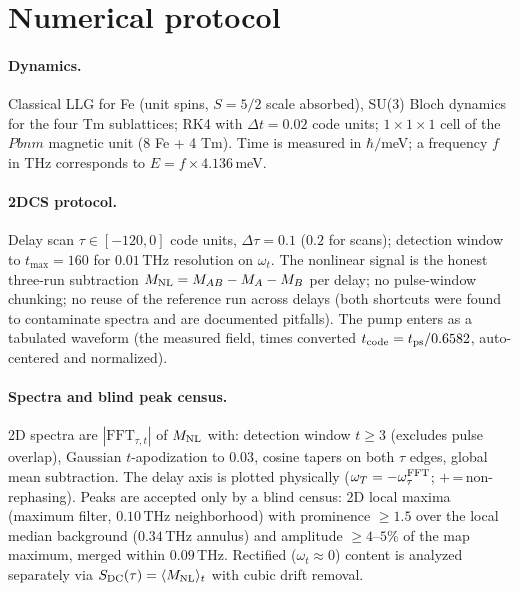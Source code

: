 \documentclass[11pt]{article}
\newcommand{\Mnl}{M_{\rm NL}}
\begin{document}
\section{Numerical protocol}
\label{si:numerics}

\paragraph{Dynamics.}  Classical LLG for Fe (unit spins, $S=5/2$ scale
absorbed), SU(3) Bloch dynamics for the four Tm sublattices; RK4 with
$\Delta t=0.02$ code units; $1\times1\times1$ cell of the $Pbnm$
magnetic unit (8 Fe + 4 Tm).  Time is measured in $\hbar/$meV; a
frequency $f$ in THz corresponds to $E=f\times4.136$\,meV.

\paragraph{2DCS protocol.}  Delay scan $\tau\in[-120,0]$ code units,
$\Delta\tau=0.1$ ($0.2$ for scans); detection window to
$t_{\max}=160$ for $0.01$\,THz resolution on $\omega_t$.  The nonlinear
signal is the honest three-run subtraction
$\Mnl=M_{AB}-M_A-M_B$ per delay; no pulse-window chunking; no reuse of
the reference run across delays (both shortcuts were found to
contaminate spectra and are documented pitfalls).  The pump enters as a
tabulated waveform (the measured field, times converted
$t_{\rm code}=t_{\rm ps}/0.6582$, auto-centered and normalized).

\paragraph{Spectra and blind peak census.}  2D spectra are
$|\mathrm{FFT}_{\tau,t}|$ of $\Mnl$ with: detection window $t\geq3$
(excludes pulse overlap), Gaussian $t$-apodization to $0.03$, cosine
tapers on both $\tau$ edges, global mean subtraction.  The delay axis is
plotted physically ($\omega_T=-\omega_\tau^{\rm FFT}$;
$+$\,=\,non-rephasing).  Peaks are accepted only by a blind census:
2D local maxima (maximum filter, $0.10$\,THz neighborhood) with
prominence $\geq1.5$ over the local median background
($0.34$\,THz annulus) and amplitude $\geq4$--$5\%$ of the map maximum,
merged within $0.09$\,THz.  Rectified ($\omega_t\approx0$) content is
analyzed separately via $S_{\rm DC}(\tau)=\langle\Mnl\rangle_t$ with
cubic drift removal.
\end{document}
